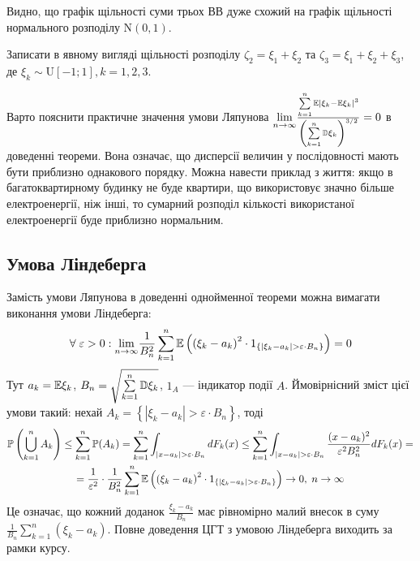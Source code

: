 Видно, що графік щільності суми трьох ВВ дуже схожий на графік щільності нормального розподілу $\mathrm{N}\left(0, 1\right)$.
\begin{exercise}
    Записати в явному вигляді щільності розподілу $\zeta_2 = \xi_1 + \xi_2$ та $\zeta_3 = \xi_1 + \xi_2 + \xi_3$, де
    $\xi_k \sim \mathrm{U}[-1; 1], k = 1,2,3$.
\end{exercise}
Варто пояснити практичне значення умови Ляпунова $\underset{n \rightarrow \infty}{\lim} \frac{\sum\limits_{k=1}^n \mathbb{E}\left| \xi_k - \mathbb{E}\xi_k\right|^3}{\left(
    \sum\limits_{k=1}^n \mathbb{D}\xi_k
\right)^{3/2}} = 0$ в доведенні теореми. Вона означає, що дисперсії величин у послідовності мають бути приблизно однакового порядку. 
Можна навести приклад з життя: якщо в багатоквартирному будинку не буде квартири, що використовує значно більше електроенергії, ніж інші,
то сумарний розподіл кількості використаної електроенергії буде приблизно нормальним.

\subsection{Умова Ліндеберга}
    Замість умови Ляпунова в доведенні однойменної теореми можна вимагати виконання умови Ліндеберга:
    $$\forall \; \varepsilon > 0 : \underset{n\to\infty}{\lim} 
    \frac{1}{B_n^2}\sum\limits_{k=1}^n \mathbb{E} \left( \left( \xi_k - a_k\right)^2 \cdot 1_{\left\{|\xi_k - a_k| > \varepsilon \cdot B_n\right\}}\right) = 0$$
    Тут $a_k = \mathbb{E}\xi_k$, $B_n = \sqrt{\sum\limits_{k=1}^n \mathbb{D}\xi_k}$, $1_A$ --- індикатор події $A$.
    Ймовірнісний зміст цієї умови такий: нехай $A_k = \left\{ \left|\xi_k - a_k \right| > \varepsilon \cdot B_n \right\}$, тоді
    \begin{gather*}
        \mathbb{P} \left( \bigcup\limits_{k=1}^n A_k\right) \leq \sum\limits_{k=1}^n \mathbb{P}(A_k) = \sum\limits_{k=1}^n \int_{|x-a_k| > \varepsilon \cdot B_n} dF_k(x) \leq
    \sum\limits_{k=1}^n \int_{|x-a_k| > \varepsilon \cdot B_n} \frac{(x-a_k)^2}{\varepsilon^2 B_n^2} dF_k(x) = \\
    = \frac{1}{\varepsilon^2} \cdot \frac{1}{B_n^2}\sum\limits_{k=1}^n \mathbb{E} \left( \left( \xi_k - a_k\right)^2 \cdot 1_{\left\{|\xi_k - a_k| > \varepsilon \cdot B_n\right\}}\right) 
    \to 0, \; n\to\infty
    \end{gather*}
    Це означає, що кожний доданок $\frac{\xi_k - a_k}{B_n}$ має рівномірно малий внесок в суму $\frac{1}{B_n}\sum\limits_{k=1}^n (\xi_k - a_k)$.
Повне доведення ЦГТ з умовою Ліндеберга виходить за рамки курсу.